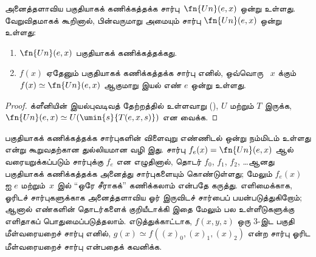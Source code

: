 \documentclass[../../../include/open-logic-section]{subfiles}
\begin{document}


\begin{thm}
அனைத்தளாவிய பகுதியாகக் கணிக்கத்தக்க சார்பு~$\fn{Un}(e,x)$ ஒன்று
உள்ளது. வேறுவிதமாகக் கூறினால், பின்வருமாறு அமையும் சார்பு
$\fn{Un}(e,x)$ ஒன்று உள்ளது:
\begin{enumerate}
\item $\fn{Un}(e,x)$ பகுதியாகக் கணிக்கத்தக்கது.
\item $f(x)$ ஏதேனும் பகுதியாகக் கணிக்கத்தக்க சார்பு எனில், ஒவ்வொரு
~$x$ க்கும் $f(x) \simeq \fn{Un}(e,x)$ ஆகுமாறு இயல் எண் $e$
ஒன்று உள்ளது.
\end{enumerate}
\end{thm}

\begin{proof}
க்ளீனியின் இயல்புவடிவத் தேற்றத்தில் உள்ளவாறு
(), $U$ மற்றும் $T$ இருக்க,
$\fn{Un}(e,x) \simeq U(\umin{s}{T(e,x,s)})$ என வைக்க.
\end{proof}

\begin{explain}
பகுதியாகக் கணிக்கத்தக்க சார்புகளின் விளைவுறு எண்ணிடல் ஒன்று நம்மிடம்
உள்ளது என்று கூறுவதற்கான துல்லியமான வழி இது. சார்பு
$f_e(x) = \fn{Un}(e,x)$ ஆல் வரையறுக்கப்படும் சார்புக்கு $f_e$
என எழுதினால், தொடர் $f_0$, $f_1$, $f_2$, \dots ஆனது பகுதியாகக்
கணிக்கத்தக்க அனைத்து சார்புகளையும் கொண்டுள்ளது; மேலும் $f_e(x)$ ஐ
$e$ மற்றும்~$x$ இல் “ஒரே சீராகக்” கணிக்கலாம் என்பதே கருத்து.
எளிமைக்காக, ஓரிடச் சார்புகளுக்காக அனைத்தளாவிய ஓர் இருவிடச் சார்பைப்
பயன்படுத்துகிறோம்; ஆனால் எண்களின் தொடர்களைக் குறியீடாக்கி இதை மேலும்
பல உள்ளீடுகளுக்கு எளிதாகப் பொதுமைப்படுத்தலாம். எடுத்துக்காட்டாக,
$f(x,y,z)$ ஒரு $3$-இட பகுதி மீள்வரையறைச் சார்பு எனில்,
$g(x) \simeq f((x)_0, (x)_1, (x)_2)$ என்ற சார்பு ஓரிட
மீள்வரையறைச் சார்பு என்பதைக் கவனிக்க.
\end{explain}
\end{document}
